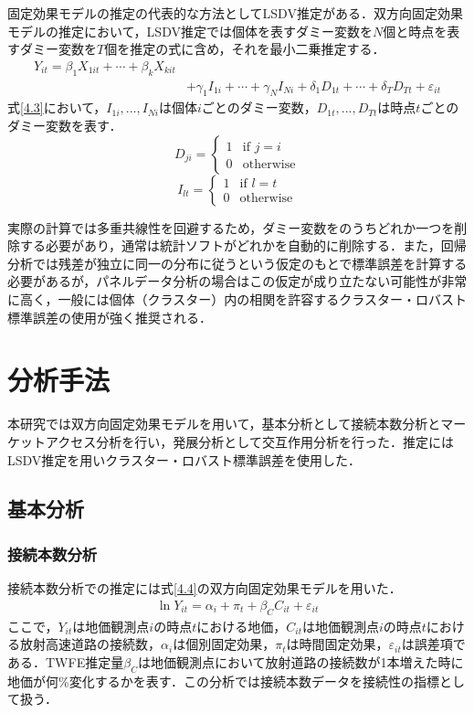 固定効果モデルの推定の代表的な方法としてLSDV推定がある．双方向固定効果モデルの推定において，LSDV推定では個体を表すダミー変数を$N$個と時点を表すダミー変数を$T$個を推定の式に含め，それを最小二乗推定する．
\begin{equation}
  \begin{aligned}
    Y_{it} = \beta_{1}X_{1it} + \cdots  + \beta_{k}X_{kit} \\
    &+ \gamma_{1}I_{1i} + \cdots + \gamma_{N}I_{Ni} + \delta_{1}D_{1t} + \cdots + \delta_{T}D_{Tt} + \varepsilon_{it}
  \end{aligned}
  \label{4.3} 
\end{equation}
式\ref{4.3}において，$I_{1i},...,I_{Ni}$は個体$i$ごとのダミー変数，$D_{1t},...,D_{Tt}$は時点$t$ごとのダミー変数を表す．
\begin{equation}
  D_{ji} =
  \begin{cases}
    1 & \text{if } j = i \\
    0 & \text{otherwise}
  \end{cases}
\end{equation}
\begin{equation}
  I_{lt} =
  \begin{cases}
    1 & \text{if } l = t \\
    0 & \text{otherwise}
  \end{cases}
\end{equation}

実際の計算では多重共線性を回避するため，ダミー変数をのうちどれか一つを削除する必要があり，通常は統計ソフトがどれかを自動的に削除する．また，回帰分析では残差が独立に同一の分布に従うという仮定のもとで標準誤差を計算する必要があるが，パネルデータ分析の場合はこの仮定が成り立たない可能性が非常に高く，一般には個体（クラスター）内の相関を許容するクラスター・ロバスト標準誤差の使用が強く推奨される．

\section{分析手法}
本研究では双方向固定効果モデルを用いて，基本分析として接続本数分析とマーケットアクセス分析を行い，発展分析として交互作用分析を行った．推定にはLSDV推定を用いクラスター・ロバスト標準誤差を使用した．
\subsection{基本分析}
\subsubsection{接続本数分析}
接続本数分析での推定には式\ref{4.4}の双方向固定効果モデルを用いた．
\begin{eqnarray}
    \ln{Y_{it}}= \alpha_{i} + \pi_{t} + \beta_{C}C_{it} + \varepsilon_{it}
  \label{4.4}
\end{eqnarray}
ここで，$Y_{it}$は地価観測点$i$の時点$t$における地価，$C_{it}$は地価観測点$i$の時点$t$における放射高速道路の接続数，$\alpha_{i}$は個別固定効果，$\pi_{t}$は時間固定効果，$\varepsilon_{it}$は誤差項である．TWFE推定量$\beta_{C}$は地価観測点において放射道路の接続数が1本増えた時に地価が何\%変化するかを表す．この分析では接続本数データを接続性の指標として扱う．

